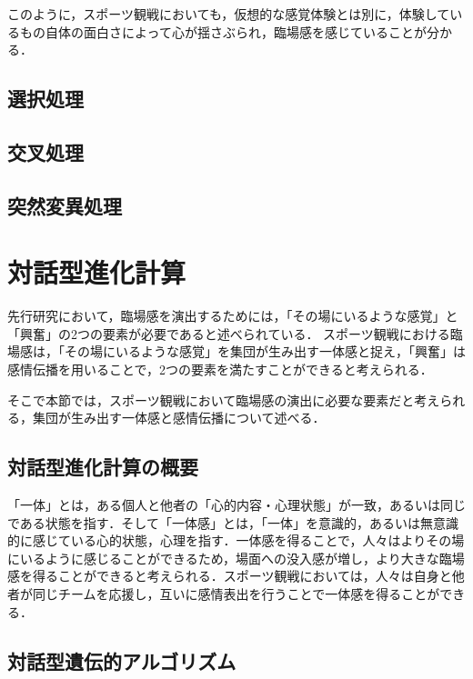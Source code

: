 このように，スポーツ観戦においても，仮想的な感覚体験とは別に，体験しているもの自体の面白さによって心が揺さぶられ，臨場感を感じていることが分かる．

\subsection{選択処理}
\label{sec2.1.3}

\subsection{交叉処理}
\label{sec2.1.4}

\subsection{突然変異処理}
\label{sec2.1.5}




\newpage

\section{対話型進化計算}
\label{sec2.2}

先行研究において，臨場感を演出するためには，「その場にいるような感覚」と「興奮」の2つの要素が必要であると述べられている．
スポーツ観戦における臨場感は，「その場にいるような感覚」を集団が生み出す一体感と捉え，「興奮」は感情伝播を用いることで，2つの要素を満たすことができると考えられる．

そこで本節では，スポーツ観戦において臨場感の演出に必要な要素だと考えられる，集団が生み出す一体感と感情伝播について述べる．

\subsection{対話型進化計算の概要}
\label{sec2.2.1}

「一体」とは，ある個人と他者の「心的内容・心理状態」が一致，あるいは同じである状態を指す．そして「一体感」とは，「一体」を意識的，あるいは無意識的に感じている心的状態，心理を指す\cite{ittai}．一体感を得ることで，人々はよりその場にいるように感じることができるため，場面への没入感が増し，より大きな臨場感を得ることができると考えられる．スポーツ観戦においては，人々は自身と他者が同じチームを応援し，互いに感情表出を行うことで一体感を得ることができる．
    
\subsection{対話型遺伝的アルゴリズム}
\label{sec2.2.2}

